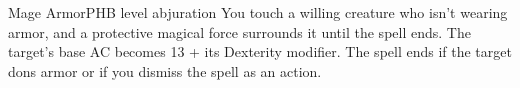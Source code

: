 \begin{spell}{Mage Armor}{PHB}{ level abjuration}
{
}
You touch a willing creature who isn't wearing armor,
and a protective magical force surrounds it until the
spell ends. The target's base AC becomes 13 + its
Dexterity modifier. The spell ends if the target dons
armor or if you dismiss the spell as an action.
\end{spell}